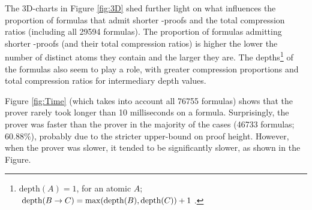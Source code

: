\documentclass{llncs}
\begin{document}
The 3D-charts in Figure \ref{fig:3D} shed further light on what influences the proportion of formulas that admit shorter {\NDd}-proofs and the total compression ratios (including all 29594 formulas). The proportion of formulas admitting shorter {\NDd}-proofs (and their total compression ratios) is higher the lower the number of distinct atoms they contain and the larger they are. The depths\footnote{$\mathrm{depth}(A) = 1$, for an atomic $A$; $\mathrm{depth}(B \rightarrow C) = \mathrm{max}(\mathrm{depth}(B), \mathrm{depth}(C)) + 1$.} of the formulas also seem to play a role, with greater compression proportions and total compression ratios for intermediary depth values.

Figure \ref{fig:Time} (which takes into account all 76755 formulas) shows that the {\ND} prover rarely took longer than 10 milliseconds on a formula. Surprisingly, the {\NDd} prover was faster than the {\ND} prover in the majority of the cases (46733 formulas; 60.88\%), probably due to the stricter upper-bound on proof height. However, when the {\NDd} prover was slower, it tended to be significantly slower, as shown in the Figure. 

\begin{figure}[!ht]
        \centering
        
        \hfill
        \caption{}\label{fig:charts}
\end{figure}
\end{document}

